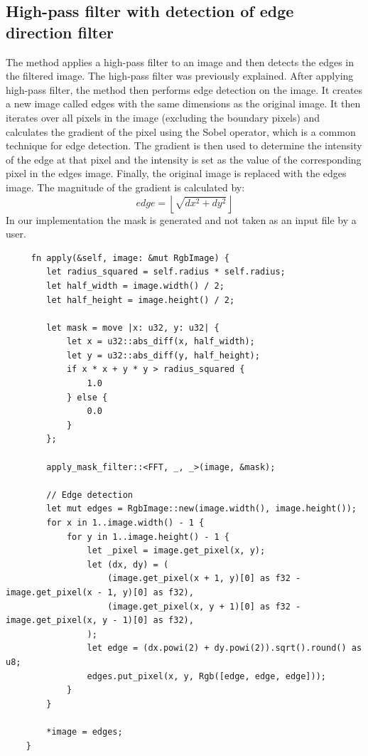 \documentclass[12pt]{article}
\begin{document}
\subsection{High-pass filter with detection of edge direction filter}
The method applies a high-pass filter to an image and then detects the edges in the filtered image. The high-pass filter was previously explained. After applying high-pass filter, the method then performs edge detection on the image. It creates a new image called edges with the same dimensions as the original image. It then iterates over all pixels in the image (excluding the boundary pixels) and calculates the gradient of the pixel using the Sobel operator, which is a common technique for edge detection. The gradient is then used to determine the intensity of the edge at that pixel and the intensity is set as the value of the corresponding pixel in the edges image. Finally, the original image is replaced with the edges image.
The magnitude of the gradient is calculated by:
\begin{equation}
edge = \left\lfloor\sqrt{dx^{2} + dy^{2}}\right\rfloor
\end{equation}
In our implementation the mask is generated and not taken as an input file by a user.
\begin{lstlisting}
     fn apply(&self, image: &mut RgbImage) {
        let radius_squared = self.radius * self.radius;
        let half_width = image.width() / 2;
        let half_height = image.height() / 2;

        let mask = move |x: u32, y: u32| {
            let x = u32::abs_diff(x, half_width);
            let y = u32::abs_diff(y, half_height);
            if x * x + y * y > radius_squared {
                1.0
            } else {
                0.0
            }
        };

        apply_mask_filter::<FFT, _, _>(image, &mask);

        // Edge detection
        let mut edges = RgbImage::new(image.width(), image.height());
        for x in 1..image.width() - 1 {
            for y in 1..image.height() - 1 {
                let _pixel = image.get_pixel(x, y);
                let (dx, dy) = (
                    (image.get_pixel(x + 1, y)[0] as f32 - image.get_pixel(x - 1, y)[0] as f32),
                    (image.get_pixel(x, y + 1)[0] as f32 - image.get_pixel(x, y - 1)[0] as f32),
                );
                let edge = (dx.powi(2) + dy.powi(2)).sqrt().round() as u8;
                edges.put_pixel(x, y, Rgb([edge, edge, edge]));
            }
        }

        *image = edges;
    }
\end{lstlisting}
\end{document}
